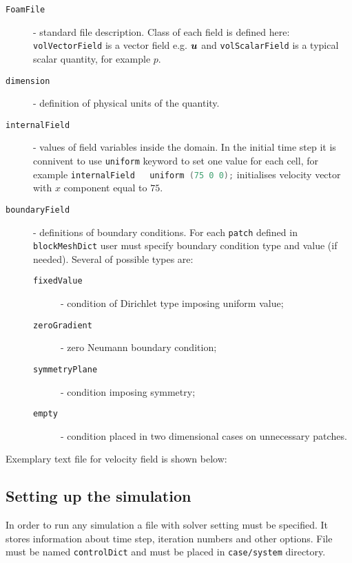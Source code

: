             \begin{description}
                \item[\texttt{FoamFile}] - standard file description. Class of each field is defined here: \lstinline{volVectorField} is a vector field e.g. $\bm{{u}}$ and \lstinline{volScalarField} is a typical scalar quantity, for example $p$.
                \item[\texttt{dimension}] - definition of physical units of the quantity.
                \item[\texttt{internalField}] - values of field variables inside the domain. In the initial time step it is connivent to use \lstinline{uniform} keyword to set one value for each cell, for example \lstinline[language=C++]{internalField   uniform (75 0 0);} initialises velocity vector with $x$ component equal to $\num{75}$.
                \item[\texttt{boundaryField}] - definitions of boundary conditions. For each \lstinline{patch} defined in \texttt{blockMeshDict} user must specify boundary condition type and value (if needed). Several of possible types are:
                \begin{description}
                    \item[\texttt{fixedValue}] - condition of Dirichlet type imposing uniform value;
                    \item[\texttt{zeroGradient}] - zero Neumann boundary condition;
                    \item[\texttt{symmetryPlane}] - condition imposing symmetry;
                    \item[\texttt{empty}] - condition placed in two dimensional cases on unnecessary patches.
                \end{description} 
            \end{description}

            
            
            Exemplary text file for velocity field is shown below:
            
        
        \subsection{Setting up the simulation}
            In order to run any simulation a file with solver setting must be specified.
            It stores information about time step, iteration numbers and other options.
            File must be named \texttt{controlDict} and must be placed in \texttt{case/system} directory.
            
